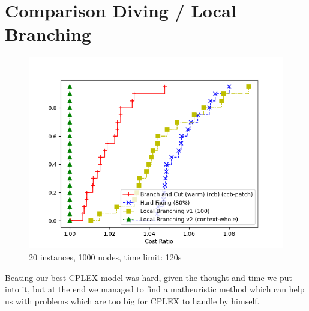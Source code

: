 \section{Comparison Diving / Local Branching}

\begin{figure}[h]
    \centering
    \includegraphics*[width=.6\textwidth]{../plots/perfprof_mat_costs_result.png}
    \caption*{20 instances, 1000 nodes, time limit: 120s}
\end{figure}

Beating our best CPLEX model was hard, given the thought and time we put into it, but at the end we managed to find a matheuristic method which can help us with problems which are too big for CPLEX to handle by himself.